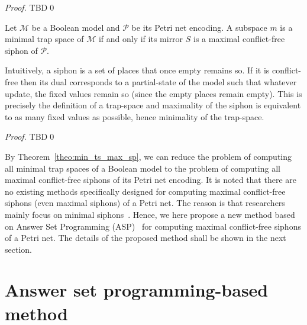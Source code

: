 \documentclass[runningheads]{llncs}
\begin{document}
\begin{proof}

  TBD\qed

\end{proof}

\begin{theorem}
\label{theo:min_ts_max_sp}
  
  Let \(\mathcal{M}\) be a Boolean model and \(\mathcal{P}\) be its Petri net encoding. A subspace \(m\) is a minimal trap space of \(\mathcal{M}\) if and only if its mirror \(S\) is a maximal conflict-free siphon of \(\mathcal{P}\).
  
\end{theorem}

Intuitively, a siphon is a set of places that once empty remains so.
If it is conflict-free then its dual corresponds to a partial-state of the model such that whatever update, the fixed values remain so (since the empty places remain empty).
This is precisely the definition of a trap-space and maximality of the siphon is equivalent to as many fixed values as possible, hence minimality of the trap-space.

\begin{proof}

  TBD\qed

\end{proof}

By Theorem~\ref{theo:min_ts_max_sp}, we can reduce the problem of computing all minimal trap spaces of a Boolean model to the problem of computing all maximal conflict-free siphons of its Petri net encoding. It is noted that there are no existing methods specifically designed for computing maximal conflict-free siphons (even maximal siphons) of a Petri net. The reason is that researchers mainly focus on minimal siphons~\cite{DBLP:journals/isci/LiuB16}. Hence, we here propose a new method based on Answer Set Programming (ASP)~\cite{DBLP:journals/aicom/GebserKKOSS11} for computing  maximal conflict-free siphons of a Petri net. The details of the proposed method shall be shown in the next section.

\section{Answer set programming-based method}
\end{document}
